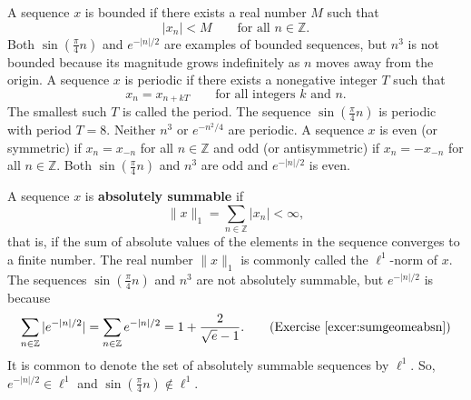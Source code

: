 \documentclass[11pt,a4paper]{book}
\theoremstyle{plain}
\numberwithin{equation}{section}
\newcommand{\reals}{{\mathbb R}}
\newcommand{\ints}{{\mathbb Z}}
\newcommand{\term}{\textbf}
\newcommand{\abs}[1]{\left\vert #1 \right\vert}
\newcommand{\sabs}[1]{\vert #1 \vert}
\begin{document}
A sequence $x$ is bounded if there exists a real number $M$ such that 
\[
\sabs{x_n} < M \qquad \text{for all $n \in \ints$}.
\]
Both $\sin( \tfrac{\pi}{4} n)$ and $e^{-\sabs{n}/2}$ are examples of bounded sequences, but $n^3$ is not bounded because its magnitude grows indefinitely as $n$ moves away from the origin.  A sequence $x$ is periodic if there exists a nonegative integer $T$ such that
\[
x_n = x_{n + kT} \qquad \text{for all integers $k$ and $n$.}
\] 
The smallest such $T$ is called the period.  The sequence $\sin( \tfrac{\pi}{4} n )$ is periodic with period $T=8$.  Neither $n^3$ or $e^{-n^2/4}$ are periodic.  
A sequence $x$ is even (or symmetric) if $x_n = x_{-n}$ for all $n \in \ints$ and odd (or antisymmetric) if $x_n = -x_{-n}$ for all $n \in \ints$.  Both $\sin(\frac{\pi}{4} n)$ and $n^3$ are odd and $e^{-\sabs{n}/2}$ is even.  

A sequence $x$ is \term{absolutely summable} if
\[
\|x\|_1 = \sum_{n \in \ints} \sabs{x_n} < \infty,
\]
that is, if the sum of absolute values of the elements in the sequence converges to a finite number.  The real number $\|x\|_1$ is commonly called the $\ell^1$-norm of $x$.  The sequences $\sin(\tfrac{\pi}{4} n)$ and $n^3$ are not absolutely summable, but $e^{-\abs{n}/2}$ is because
\[
\sum_{n \in \ints} \sabs{e^{-\sabs{n}/2}} = \sum_{n \in \ints} e^{-\sabs{n}/2} = 1 + \frac{2}{\sqrt{e} - 1}. \qquad \text{(Exercise~\ref{excer:sumgeomeabsn})}
\]
It is common to denote the set of absolutely summable sequences by $\ell^1$.  So, $e^{-\sabs{n}/2} \in \ell^1$ and $\sin(\tfrac{\pi}{4} n) \notin \ell^1$.
\end{document}

